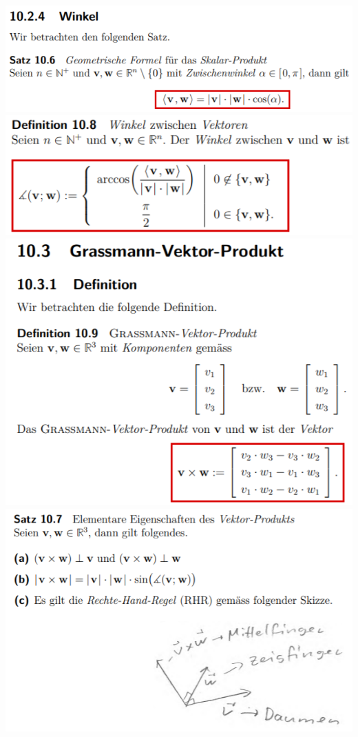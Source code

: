 \includegraphics[width=\columnwidth]{./images/vek13.png}
\includegraphics[width=\columnwidth]{./images/vek14.png}
\includegraphics[width=\columnwidth]{./images/vek15.png}
\includegraphics[width=\columnwidth]{./images/vek16.png}
